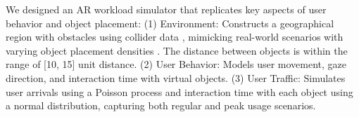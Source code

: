     We designed an AR workload simulator that replicates key aspects of user behavior and object placement: (1) Environment: Constructs a geographical region with obstacles using collider data \cite{bib:collider}, mimicking real-world scenarios with varying object placement densities . The distance between objects is within the range of [10, 15] unit distance. (2) User Behavior: Models user movement, gaze direction, and interaction time with virtual objects. (3) User Traffic: Simulates user arrivals using a Poisson process and interaction time with each object using a normal distribution, capturing both regular and peak usage scenarios.
